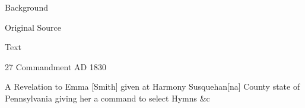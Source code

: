 			\begin{description}
				\item[Background]
			\end{description}
			
			
			\begin{description}
				\item[Original Source]
			\end{description}
			
			
			\begin{description}
				\item[Text]
			\end{description}
				
				\begin{tightcenter}
				27 Commandment AD 1830
				\end{tightcenter}
				
				A Revelation to Emma [Smith] given at Harmony Susquehan[na] County state of Pennsylvania giving her a command to select Hymns \&c
				

